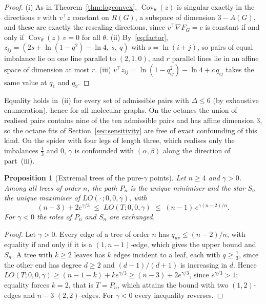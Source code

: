 \documentclass[a5paper, 10pt]{article}
\theoremstyle{plain}
\newtheorem{proposition}[theorem]{Proposition}
\theoremstyle{remark}
\theoremstyle{definition}
\begin{document}
  \begin{proof}
  (i) As in Theorem~\ref{thm:logconvex}, $\operatorname{Cov}_{\theta}(z)$
  is singular exactly in the directions $v$ with $v^{\top} z$ constant on
  $R(G)$, a subspace of dimension $3 - A(G)$, and these are exactly the
  rescaling directions, since $v^{\top}\nabla F_G = c$ is constant if
  and only if $\operatorname{Cov}_{\theta}(z)\,v = 0$ for all $\theta$.
  (ii) By~\eqref{eq:factor},
  $z_{ij} = (2s + \ln(1-q^2) - \ln 4,\ s,\ q)$ with $s = \ln(i+j)$, so
  pairs of equal imbalance lie on one line parallel to $(2,1,0)$, and $r$
  parallel lines lie in an affine space of dimension at most $r$.
  (iii) $v^{\top} z_{ij} = \ln(1 - q_{ij}^2) - \ln 4 + c\,q_{ij}$ takes
  the same value at $q_1$ and $q_2$.
  \end{proof}

  Equality holds in~(ii) for every set of admissible pairs with
  $\Delta \le 6$ (by exhaustive enumeration), hence for all molecular
  graphs. On the octanes the union of realised pairs contains nine of the
  ten admissible pairs and has affine dimension $3$, so the octane fits
  of Section~\ref{sec:sensitivity} are free of exact confounding of this
  kind. On the spider with four legs of length three, which realises
  only the imbalances $\tfrac13$ and $0$, $\gamma$ is confounded with
  $(\alpha,\beta)$ along the direction of part~(iii).

\begin{proposition}[Extremal trees of the pure-$\gamma$ points]\label{prop:extremal}
Let $n \ge 4$ and $\gamma > 0$. Among all trees of order $n$, the
path $P_n$ is the unique minimiser and the star $S_n$ the unique
maximiser of $LO(\cdot\,;0,0,\gamma)$, with
\[
(n-3) + 2e^{\gamma/3} \;\le\; LO(T;0,0,\gamma) \;\le\; (n-1)\,e^{\gamma(n-2)/n}.
\]
For $\gamma < 0$ the roles of $P_n$ and $S_n$ are exchanged.
\end{proposition}

\begin{proof}
Let $\gamma > 0$. Every edge of a tree of order $n$ has
$q_{uv} \le (n-2)/n$, with equality if and only if it is a
$(1,n-1)$-edge, which gives the upper bound and $S_n$. A tree with
$k \ge 2$ leaves has $k$ edges incident to a leaf, each with
$q \ge \tfrac13$, since the other end has degree $d \ge 2$ and
$(d-1)/(d+1)$ is increasing in $d$. Hence
$LO(T;0,0,\gamma) \ge (n-1-k) + k e^{\gamma/3} \ge (n-3) + 2e^{\gamma/3}$,
since $e^{\gamma/3} > 1$; equality forces $k = 2$, that is $T = P_n$, which
attains the bound with two $(1,2)$-edges and $n-3$ $(2,2)$-edges. For $\gamma < 0$ every
inequality reverses.
\end{proof}
\end{document}
